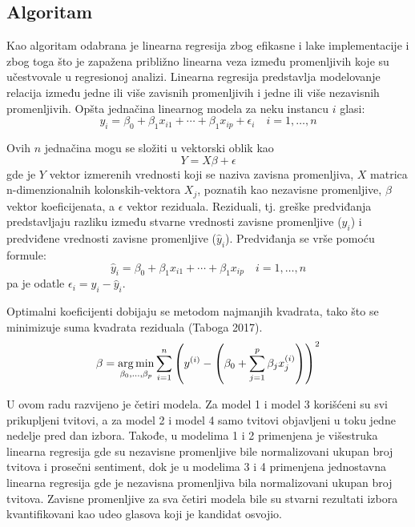 \subsection{Algoritam}

Kao algoritam odabrana je linearna regresija zbog efikasne i lake implementacije i zbog toga što je
zapažena približno linearna veza između promenljivih koje su učestvovale u regresionoj analizi.
Linearna regresija predstavlja modelovanje relacija između jedne ili više zavisnih promenljivih i jedne
ili više nezavisnih promenljivih. Opšta jednačina linearnog modela za neku instancu $i$ glasi:
\begin{equation*}
    y_i = \beta_0 + \beta_1 x_{i1} + \cdots + \beta_1 x_{ip} + \epsilon_i \quad i = 1, \dots, n
\end{equation*}

Ovih $n$ jednačina mogu se složiti u vektorski oblik kao
\begin{equation*}
    Y = X\beta + \epsilon
\end{equation*}
gde je $Y$ vektor izmerenih vrednosti koji se naziva zavisna promenljiva, $X$ matrica n-dimenzionalnih
kolonskih-vektora $X_j$, poznatih kao nezavisne promenljive, $\beta$ vektor koeficijenata, a $\epsilon$ vektor reziduala. Reziduali, tj. greške predviđanja predstavljaju razliku između stvarne vrednosti zavisne promenljive ($y_i$) i predviđene vrednosti zavisne promenljive ($\hat{y}_i$). Predviđanja se vrše pomoću formule:
\begin{equation*}
    \hat{y}_i = \beta_0 + \beta_1 x_{i1} + \cdots + \beta_1 x_{ip} \quad i = 1, \dots, n
\end{equation*}
pa je odatle $\epsilon_i = y_i - \hat{y}_i$.

Optimalni koeficijenti dobijaju se metodom najmanjih kvadrata, tako što se minimizuje suma kvadrata
reziduala (Taboga 2017).
\begin{equation*}
    \beta = \operatorname*{arg\,min}_{\beta_0,\dots,\beta_p} \sum^n_{i=1} \left(
        y^{(i)} - \left(
            \beta_0 + \sum^p_{j=1} \beta_j x^{(i)}_j
        \right)
    \right)^2
\end{equation*}

U ovom radu razvijeno je četiri modela. Za model 1 i model 3 korišćeni su svi prikupljeni tvitovi, a za
model 2 i model 4 samo tvitovi objavljeni u toku jedne nedelje pred dan izbora. Takođe, u modelima
1 i 2 primenjena je višestruka linearna regresija gde su nezavisne promenljive bile normalizovani
ukupan broj tvitova i prosečni sentiment, dok je u modelima 3 i 4 primenjena jednostavna linearna
regresija gde je nezavisna promenljiva bila normalizovani ukupan broj tvitova. Zavisne promenljive
za sva četiri modela bile su stvarni rezultati izbora kvantifikovani kao udeo glasova koji je kandidat
osvojio.

